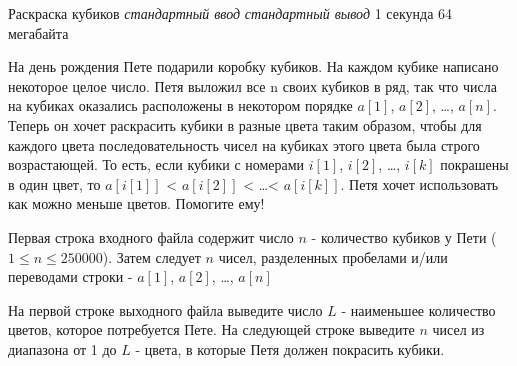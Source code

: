 \begin{problem}%
{Раскраска кубиков}%
{\textsl{стандартный ввод}}%
{\textsl{стандартный вывод}}%
{1 секунда}%
{64 мегабайта}{}

На день рождения Пете подарили коробку кубиков. На каждом кубике написано некоторое целое число. Петя выложил все n своих кубиков в ряд, так что числа на кубиках оказались расположены в некотором порядке $a[1]$, $a[2]$, \dots, $a[n]$. Теперь он хочет раскрасить кубики в разные цвета таким образом, чтобы для каждого цвета последовательность чисел на кубиках этого цвета была строго возрастающей. То есть, если кубики с номерами $i[1]$, $i[2]$, \dots, $i[k]$ покрашены в один цвет, то $a[i[1]]$ < $a[i[2]]$ < \dots < $a[i[k]]$. Петя хочет использовать как можно меньше цветов. Помогите ему!

\InputFile

Первая строка входного файла содержит число $n$ - количество кубиков у Пети ($1 \le n \le 250000$). Затем следует $n$ чисел, разделенных пробелами и/или переводами строки - $a[1]$, $a[2]$, \dots, $a[n]$

\OutputFile

На первой строке выходного файла выведите число $L$ - наименьшее количество цветов, которое потребуется Пете. На следующей строке выведите $n$ чисел из диапазона от 1 до $L$ - цвета, в которые Петя должен покрасить кубики.

\Examples

\begin{example}
%
\end{example}
\end{problem}